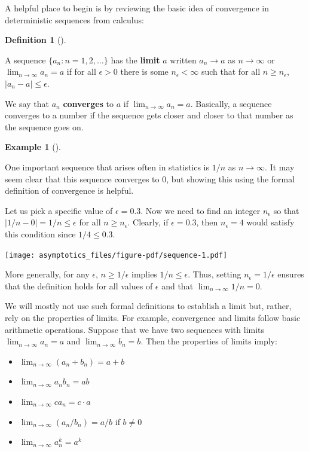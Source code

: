 \documentclass[
  13pt,
  letterpaper,
  DIV=11,
  numbers=noendperiod]{scrreprt}
\providecommand{\tightlist}{%
  \setlength{\itemsep}{0pt}\setlength{\parskip}{0pt}}\usepackage{longtable,booktabs,array}
\theoremstyle{plain}
\theoremstyle{definition}
\newtheorem{example}{Example}[chapter]
\theoremstyle{definition}
\newtheorem{definition}{Definition}[chapter]
\theoremstyle{remark}
\begin{document}
A helpful place to begin is by reviewing the basic idea of convergence
in deterministic sequences from calculus:

\begin{definition}[]\protect\hypertarget{def-limit}{}\label{def-limit}

A sequence \(\{a_n: n = 1, 2, \ldots\}\) has the \textbf{limit} \(a\)
written \(a_n \rightarrow a\) as \(n\rightarrow \infty\) or
\(\lim_{n\rightarrow \infty} a_n = a\) if for all \(\epsilon > 0\) there
is some \(n_{\epsilon} < \infty\) such that for all
\(n \geq n_{\epsilon}\), \(|a_n - a| \leq \epsilon\).

\end{definition}

We say that \(a_n\) \textbf{converges} to \(a\) if
\(\lim_{n\rightarrow\infty} a_n = a\). Basically, a sequence converges
to a number if the sequence gets closer and closer to that number as the
sequence goes on.

\begin{example}[]\protect\hypertarget{exm-limit}{}\label{exm-limit}

One important sequence that arises often in statistics is \(1/n\) as
\(n\to\infty\). It may seem clear that this sequence converges to 0, but
showing this using the formal definition of convergence is helpful.

Let us pick a specific value of \(\epsilon = 0.3\). Now we need to find
an integer \(n_{\epsilon}\) so that \(|1/n - 0| = 1/n \leq \epsilon\)
for all \(n \geq n_{\epsilon}\). Clearly, if \(\epsilon = 0.3\), then
\(n_{\epsilon} = 4\) would satisfy this condition since
\(1/4 \leq 0.3\).

\texttt{[image: asymptotics\_files/figure-pdf/sequence-1.pdf]}

More generally, for any \(\epsilon\), \(n \geq 1/\epsilon\) implies
\(1/n \leq \epsilon\). Thus, setting \(n_{\epsilon} = 1/\epsilon\)
ensures that the definition holds for all values of \(\epsilon\) and
that \(\lim_{n\to\infty} 1/n = 0\).

\end{example}

We will mostly not use such formal definitions to establish a limit but,
rather, rely on the properties of limits. For example, convergence and
limits follow basic arithmetic operations. Suppose that we have two
sequences with limits \(\lim_{n\to\infty} a_n = a\) and
\(\lim_{n\to\infty} b_n = b\). Then the properties of limits imply:

\begin{itemize}
\tightlist
\item
  \(\lim_{n\to\infty} (a_n + b_n) = a + b\)
\item
  \(\lim_{n\to\infty} a_nb_n = ab\)
\item
  \(\lim_{n\to\infty} ca_n = c\cdot a\)
\item
  \(\lim_{n\to\infty} (a_n/b_n) = a/b\) if \(b \neq 0\)
\item
  \(\lim_{n\to\infty} a_n^{k} = a^{k}\)
\end{itemize}
\end{document}
